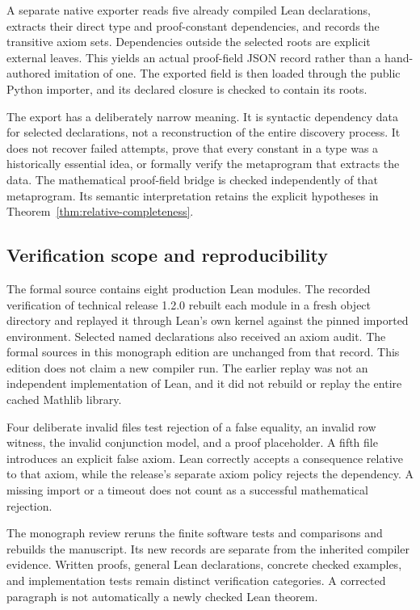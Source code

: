 \documentclass[11pt,oneside]{article}
\theoremstyle{komorebiplain}
\theoremstyle{komorebidefinition}
\theoremstyle{komorebiremark}
\begin{document}
A separate native exporter reads five already compiled Lean declarations, extracts their direct type and proof-constant dependencies, and records the transitive axiom sets. Dependencies outside the selected roots are explicit external leaves. This yields an actual proof-field JSON record rather than a hand-authored imitation of one. The exported field is then loaded through the public Python importer, and its declared closure is checked to contain its roots.

The export has a deliberately narrow meaning. It is syntactic dependency data for selected declarations, not a reconstruction of the entire discovery process. It does not recover failed attempts, prove that every constant in a type was a historically essential idea, or formally verify the metaprogram that extracts the data. The mathematical proof-field bridge is checked independently of that metaprogram. Its semantic interpretation retains the explicit hypotheses in Theorem~\ref{thm:relative-completeness}.

\subsection{Verification scope and reproducibility}

The formal source contains eight production Lean modules. The recorded verification of technical release 1.2.0 rebuilt each module in a fresh object directory and replayed it through Lean's own kernel against the pinned imported environment. Selected named declarations also received an axiom audit. The formal sources in this monograph edition are unchanged from that record. This edition does not claim a new compiler run. The earlier replay was not an independent implementation of Lean, and it did not rebuild or replay the entire cached Mathlib library.

Four deliberate invalid files test rejection of a false equality, an invalid row witness, the invalid conjunction model, and a proof placeholder. A fifth file introduces an explicit false axiom. Lean correctly accepts a consequence relative to that axiom, while the release's separate axiom policy rejects the dependency. A missing import or a timeout does not count as a successful mathematical rejection.

The monograph review reruns the finite software tests and comparisons and rebuilds the manuscript. Its new records are separate from the inherited compiler evidence. Written proofs, general Lean declarations, concrete checked examples, and implementation tests remain distinct verification categories. A corrected paragraph is not automatically a newly checked Lean theorem.
\end{document}
